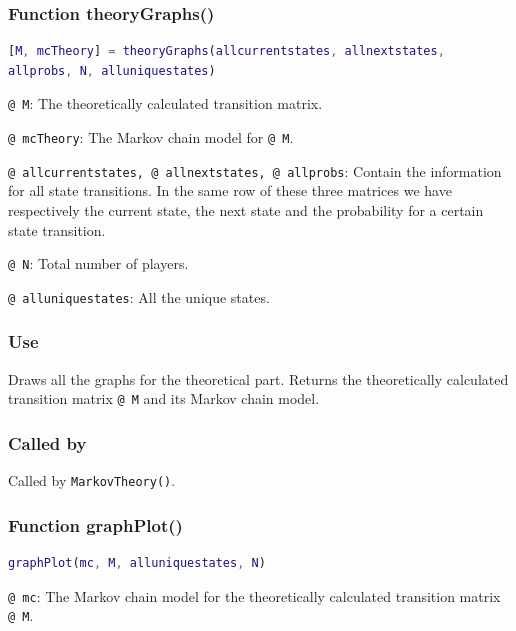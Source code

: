 \documentclass[12pt]{report}
\begin{document}
\subsubsection*{Function theoryGraphs()}

\begin{lstlisting}[language=Matlab]
[M, mcTheory] = theoryGraphs(allcurrentstates, allnextstates,
allprobs, N, alluniquestates)

\end{lstlisting}

\texttt{@ M}: The theoretically calculated transition matrix.

\texttt{@ mcTheory}: The Markov chain model for \texttt{@ M}.

\texttt{@ allcurrentstates, @ allnextstates, @ allprobs}: Contain the information for all state transitions. In the same row of these three matrices we have respectively the current state, the next state and the probability for a certain state transition.

\texttt{@ N}: Total number of players.

\texttt{@ alluniquestates}: All the unique states.

\subsubsection*{Use}
Draws all the graphs for the theoretical part. Returns the theoretically calculated transition matrix \texttt{@ M} and its Markov chain model.

\subsubsection*{Called by}
Called by \texttt{MarkovTheory()}.








\subsubsection*{Function graphPlot()}

\begin{lstlisting}[language=Matlab]
graphPlot(mc, M, alluniquestates, N)

\end{lstlisting}

\texttt{@ mc}: The Markov chain model for the theoretically calculated transition matrix \texttt{@ M}.
\end{document}
